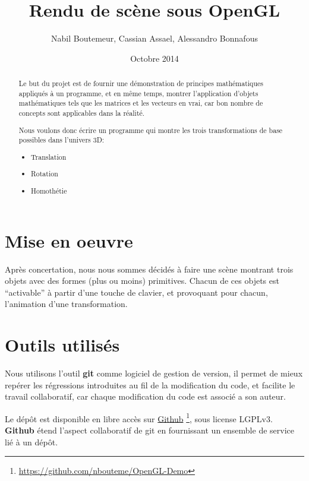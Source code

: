 \documentclass[pdftex, 11pt, a4paper, titlepage]{article}
\begin{document}
\title{Rendu de scène sous OpenGL}
\author{Nabil Boutemeur,
         Cassian Assael,
   Alessandro Bonnafous} 
\date{Octobre 2014}
\maketitle

\setcounter{tocdepth}{4}
\setcounter{secnumdepth}{-1}

\tableofcontents
\setlength{\parskip}{0.5em}
\pagebreak

\begin{abstract}
  Le but du projet est de fournir une démonstration de principes
  mathématiques appliqués à un programme, et en même temps, montrer
  l'application d'objets mathématiques tels que les matrices et les
  vecteurs en vrai, car bon nombre de concepts sont applicables dans
  la réalité.

  Nous voulons donc écrire un programme qui montre les trois
  transformations de base possibles dans l'univers 3D:
  \begin{itemize}
  \item Translation
  \item Rotation
  \item Homothétie
  \end{itemize}
\end{abstract}
\pagebreak
\section*{Mise en oeuvre}

Après concertation, nous nous sommes décidés à faire une scène
montrant trois objets avec des formes (plus ou moins) primitives.
Chacun de ces objets est ``activable'' à partir d'une touche de
clavier, et provoquant pour chacun, l'animation d'une transformation.

\section*{Outils utilisés}

Nous utilisons l'outil \textbf{git} comme logiciel de gestion de
version, il permet de mieux repérer les régressions introduites au fil
de la modification du code, et facilite le travail collaboratif, car
chaque modification du code est associé a son auteur.

Le dépôt est disponible en libre accès sur
\href{https://github.com/nbouteme/OpenGL-Demo}{{\color{blue}Github}}
\footnote{\url{https://github.com/nbouteme/OpenGL-Demo}},
sous license LGPLv3.  \textbf{Github} étend l'aspect collaboratif de
git en fournissant un ensemble de service lié à un dépôt.
\end{document}
